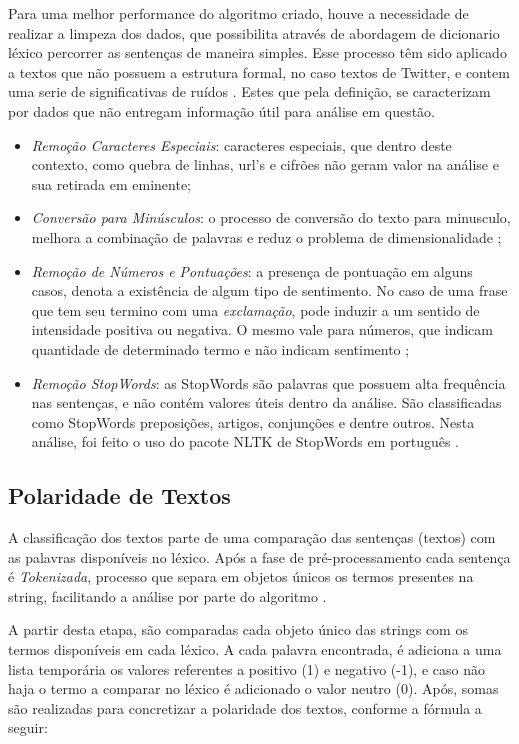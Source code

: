 \documentclass[conference]{IEEEtran}
\begin{document}
Para uma melhor performance do algoritmo criado, houve a necessidade de realizar a limpeza dos dados, que possibilita através de abordagem de dicionario léxico percorrer as sentenças de maneira simples. Esse processo têm sido aplicado a textos que não possuem a estrutura formal, no caso textos de Twitter, e contem uma serie de significativas de ruídos \cite{Symeon:2018}. Estes que pela definição, se caracterizam por dados que não entregam informação útil para análise em questão.

\begin{itemize}
    \item \textit{Remoção Caracteres Especiais}: caracteres especiais, que dentro deste contexto, como quebra de linhas, url's e cifrões não geram valor na análise e sua retirada em eminente; 
    \item \textit{Conversão para Minúsculos}: o processo de conversão do texto para minusculo, melhora a combinação de palavras e reduz o problema de dimensionalidade \cite{Santos:2014};
    \item \textit{Remoção de Números e Pontuações}: a presença de pontuação em alguns casos, denota a existência de algum tipo de sentimento. No caso de uma frase que tem seu termino com uma \textit{exclamação}, pode induzir a um sentido de intensidade positiva ou negativa. O mesmo vale para números, que indicam quantidade de determinado termo e não indicam sentimento \cite{He:2011};
    \item \textit{Remoção StopWords}: as StopWords são palavras que possuem alta frequência nas sentenças, e não contém valores úteis dentro da análise. São classificadas como StopWords preposições, artigos, conjunções e dentre outros. Nesta análise, foi feito o uso do pacote NLTK de StopWords em português \cite{Loper:2002}. 
\end{itemize}

\subsection{Polaridade de Textos}

A classificação dos textos parte de uma comparação das sentenças (textos) com as palavras disponíveis no léxico. Após a fase de pré-processamento cada sentença é \textit{Tokenizada}, processo que separa em objetos únicos os termos presentes na string, facilitando a análise por parte do algoritmo \cite{Taweh:2018}. 

A partir desta etapa, são comparadas cada objeto único das strings com os termos disponíveis em cada léxico. A cada palavra encontrada, é adiciona a uma lista temporária os valores referentes a positivo (1) e negativo (-1), e caso não haja o termo a comparar no léxico é adicionado o valor neutro (0). Após, somas são realizadas para concretizar a polaridade dos textos, conforme a fórmula a seguir:
\end{document}

